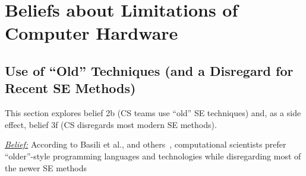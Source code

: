 \documentclass[sigconf,review,anonymous]{acmart}
\begin{document}
 








\section{Beliefs about Limitations of Computer Hardware}


\subsection{Use of ``Old'' Techniques (and a Disregard for  Recent SE Methods)}\label{lang}
This section explores belief 2b (CS teams use ``old'' SE techniques)
and, as a side effect, belief 3f (CS disregards most modern SE methods).

\noindent \textit{\underline{Belief:}} According to Basili et al., and others~\cite{basili08_hpc, carver07_environment, Prabhu11_cssurvey, kendall05_C, ragan14_pythoncs},
computational scientists prefer
``older''-style programming languages and technologies while disregarding most of the newer SE methods
\end{document}
